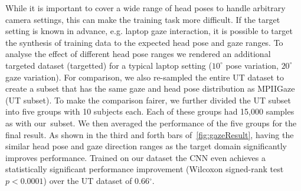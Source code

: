 While it is important to cover a wide range of head poses to handle arbitrary camera settings, this can make the training task more difficult.
If the target setting is known in advance, e.g. laptop gaze interaction, it is  possible to target the synthesis of training data to the expected head pose and gaze ranges.
To analyse the effect of different head pose ranges we rendered an additional targeted dataset (\dataset targetted) for a typical laptop setting ($10^{\circ}$ pose variation, $20^{\circ}$ gaze variation).
For comparison, we also re-sampled the entire UT dataset to create a subset that has the same gaze and head pose distribution as MPIIGaze (UT subset).
To make the comparison fairer, we further divided the UT subset into five groups with 10 subjects each.
Each of these groups had 15,000 samples as with our~\dataset subset.
We then averaged the performance of the five groups for the final result. 
As shown in the third and forth bars of~\autoref{fig:gazeResult}, having the similar head pose and gaze direction ranges as the target domain significantly improves performance.
Trained on our \dataset dataset the CNN even achieves a statistically significant performance improvement (Wilcoxon signed-rank test  $p\!<\!0.0001$) over the UT dataset of 0.66$^{\circ}$.


